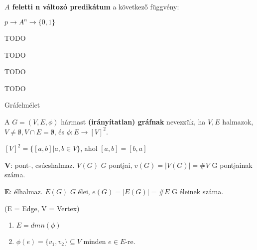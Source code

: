\documentclass[10pt]{article}
\renewcommand{\\}{\par\noindent}
\begin{document}
\begin{frame}

\begin{tcolorbox}[title={$A$ feletti n változó predikátum}]
\textbf{$A$ feletti n változó predikátum} a következő függvény:\\
$p \rightarrow A^n \rightarrow \{0, 1\}$
\end{tcolorbox}

\begin{tcolorbox}[title={Az $L$ elsőrendű nyelv szimbólumai}]
TODO
\end{tcolorbox}

\begin{tcolorbox}[title={Az $L$ elsőrendű nyelv formulái}]
TODO
\end{tcolorbox}

\begin{tcolorbox}[title={Kötött, szabad változó, nyílt, zárt formula}]
TODO
\end{tcolorbox}

\begin{tcolorbox}[title={Az elsőrendű nyelv szemantikája}]
TODO
\end{tcolorbox}

\end{frame}


\begin{frame}[plain]
\begin{tcolorbox}[center, colback={myyellow}, coltext={black}, colframe={myyellow}]
    {\Huge Gráfelmélet}
\end{tcolorbox}
\end{frame}


\begin{frame}

\begin{tcolorbox}[title={Gráf}]
A $G = (V, E, {\phi})$ hármast \textbf{(irányítatlan) gráfnak} nevezzük, ha $V, E$ halmazok, $V \neq \emptyset, V \cap E = \emptyset$, és $\phi : E \rightarrow [V]^2$.\\
\bigskip
$[V]^2 = \{ [a, b] | a, b \in V \}$, ahol $[a, b] = [b, a]$\\
\bigskip
\textbf{V}: pont-, csúcshalmaz. $V(G)$ $G$ pontjai, $v(G) = |V(G)| = \#V$ G pontjainak száma.\\
\bigskip
\textbf{E}: élhalmaz. $E(G)$ $G$ élei, $e(G) = |E(G)| = \#E$ G éleinek száma.\\
\bigskip
(E = Edge, V = Vertex)
\end{tcolorbox}

\begin{tcolorbox}[title={Ész}]
\begin{enumerate}
\item $E = dmn({\phi})$
\item ${\phi}(e) = \{v_1, v_2\} \subseteq V$ minden $e \in E$-re.
\end{enumerate}
\end{tcolorbox}

\end{frame}
\end{document}
